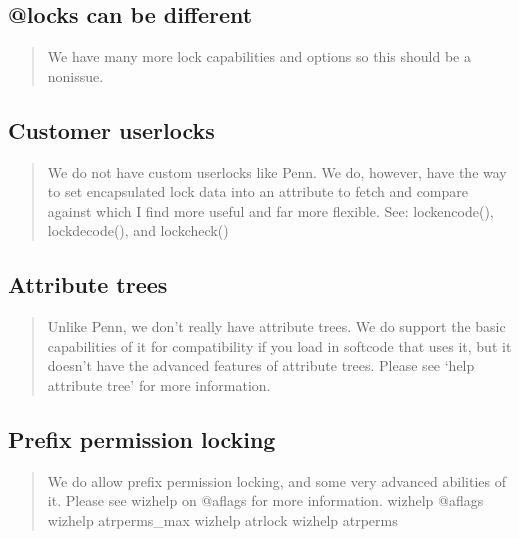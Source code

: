 \documentclass[letterpaper,10pt,english]{sphinxmanual}
\begin{document}
\subsection{@locks can be different}
\label{\detokenize{differences:locks-can-be-different}}\begin{quote}

\sphinxAtStartPar
We have many more lock capabilities and options
so this should be a non\sphinxhyphen{}issue.
\end{quote}


\subsection{Customer user\sphinxhyphen{}locks}
\label{\detokenize{differences:customer-user-locks}}\begin{quote}

\sphinxAtStartPar
We do not have custom user\sphinxhyphen{}locks like Penn.  We do, however, have the way
to set encapsulated lock data into an attribute to fetch and compare
against which I find more useful and far more flexible.
See: lockencode(), lockdecode(), and lockcheck()
\end{quote}


\subsection{Attribute trees}
\label{\detokenize{differences:attribute-trees}}\begin{quote}

\sphinxAtStartPar
Unlike Penn, we don’t really have attribute trees.  We do support the
basic capabilities of it for compatibility if you load in softcode that
uses it, but it doesn’t have the advanced features of attribute trees.
Please see ‘help attribute tree’ for more information.
\end{quote}


\subsection{Prefix permission locking}
\label{\detokenize{differences:prefix-permission-locking}}\begin{quote}

\sphinxAtStartPar
We do allow prefix permission locking, and some very advanced abilities
of it.  Please see wizhelp on @aflags for more information.
\sphinxhyphen{} wizhelp @aflags
\sphinxhyphen{} wizhelp atrperms\_max
\sphinxhyphen{} wizhelp atrlock
\sphinxhyphen{} wizhelp atrperms
\end{quote}
\end{document}
